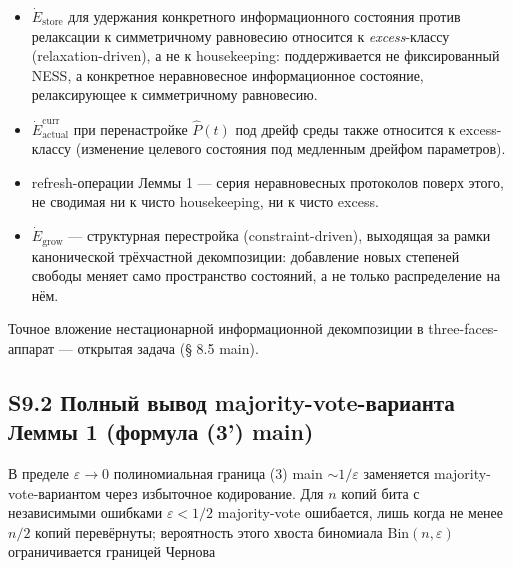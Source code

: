 \documentclass[pdflatex,sn-mathphys-ay]{sn-jnl}
\providecommand{\tightlist}{\setlength{\itemsep}{0pt}\setlength{\parskip}{0pt}}
\begin{document}
\begin{itemize}

\tightlist

\item

  \(\dot{E}_{\text{store}}\) для удержания конкретного информационного состояния против релаксации к симметричному равновесию относится к \emph{excess}-классу (relaxation-driven), а не к housekeeping: поддерживается не фиксированный NESS, а конкретное неравновесное информационное состояние, релаксирующее к симметричному равновесию.

\item

  \(\dot{E}_{\text{actual}}^{\text{curr}}\) при перенастройке \(\hat P(t)\) под дрейф среды также относится к excess-классу (изменение целевого состояния под медленным дрейфом параметров).

\item

  refresh-операции Леммы 1 --- серия неравновесных протоколов поверх этого, не сводимая ни к чисто housekeeping, ни к чисто excess.

\item

  \(\dot{E}_{\text{grow}}\) --- структурная перестройка (constraint-driven), выходящая за рамки канонической трёхчастной декомпозиции: добавление новых степеней свободы меняет само пространство состояний, а не только распределение на нём.

\end{itemize}



Точное вложение нестационарной информационной декомпозиции в three-faces-аппарат --- открытая задача (§ 8.5 main).



\subsection*{S9.2 Полный вывод majority-vote-варианта Леммы 1 (формула (3') main)}\label{s9.2-ux43fux43eux43bux43dux44bux439-ux432ux44bux432ux43eux434-majority-vote-ux432ux430ux440ux438ux430ux43dux442ux430-ux43bux435ux43cux43cux44b-1-ux444ux43eux440ux43cux443ux43bux430-3-main}



В пределе \(\varepsilon \to 0\) полиномиальная граница (3) main \(\sim 1/\varepsilon\) заменяется majority-vote-вариантом через избыточное кодирование. Для \(n\) копий бита с независимыми ошибками \(\varepsilon < 1/2\) majority-vote ошибается, лишь когда не менее \(n/2\) копий перевёрнуты; вероятность этого хвоста биномиала \(\mathrm{Bin}(n,\varepsilon)\) ограничивается границей Чернова
\end{document}
